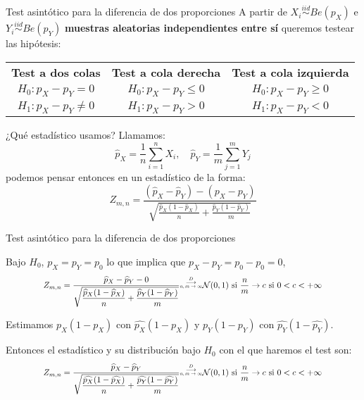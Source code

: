 \documentclass{beamer}
\theoremstyle{definition}
\newcommand\scalemath[2]{\scalebox{#1}{\mbox{\ensuremath{\displaystyle #2}}}}
\begin{document}
\begin{frame}{\color{rosee} Test asint\'otico para la diferencia de dos
   proporciones}\small
 A partir de $X_i\stackrel{iid}{\sim}Be(p_X)$ e $Y_i\stackrel{iid}{\sim}Be(p_Y)$ \textbf{muestras aleatorias independientes entre sí} queremos testear las hip\'otesis:

 \begin{center}
\begin{center}
\begin{tabular}{c|c|c}
\textbf{Test a dos colas} & \textbf{Test a cola derecha} & \textbf{Test a cola izquierda}\\
$H_0: p_X-p_Y = 0$  & $H_0: p_X-p_Y\leq 0$  &$H_0:p_X-p_Y\geq 0$\\
$H_1: p_X-p_Y \neq 0$  & $H_1: p_X-p_Y>0$  &$H_1:p_X-p_Y <0$
\end{tabular}
 \end{center}
     \end{center}
 ¿Qu\'e estad\'istico usamos?  Llamamos:
     \[\widehat{p}_X = \frac{1}{n}\sum_{i=1}^{n}X_i, \quad
       \widehat{p}_Y = \frac{1}{m}\sum_{j=1}^{m}Y_j \]  podemos
     pensar entonces en un estad\'istico de la forma:
     \[Z_{m,n} =  \frac{(\widehat{p}_X -
         \widehat{p}_Y)-(p_X-p_Y)}{\sqrt{\frac{\widehat{p}_X(1-\widehat{p}_X)}{n} +
           \frac{\widehat{p}_Y(1-\widehat{p}_Y)}{m}}}\]

 
\end{frame}

\begin{frame}{\color{rosee} Test asint\'otico para la diferencia de dos proporciones}
 \small
 
 Bajo $H_0$, $p_X=p_Y=p_0$ lo que implica que
     $p_X-p_Y=p_0-p_0=0$,
     \[\scalemath{0.85}{Z_{m,n} =  \dfrac{\widehat{p}_X -
         \widehat{p}_Y-0}{\sqrt{\dfrac{\widehat{p}_X(1-\widehat{p}_X)}{n} + \dfrac{\widehat{p}_Y(1-\widehat{p}_Y)}{m}}}
       \overset{\stackrel{D}{\longrightarrow}}{\scalemath{0.6}{n,m\to\infty}} \mathcal{N}(0,1) \text{ si } \frac{n}{m}\to c \text{ si } 0<c<+\infty}\]

 Estimamos $p_X(1-p_X)$ con $\widehat{p_X}(1-\widehat{p_X})$ y $p_Y(1-p_Y)$ con $\widehat{p_Y}(1-\widehat{p_Y})$.
 
 \medskip
 
         Entonces el estadístico y su distribución bajo $H_0$ con el que haremos el test son:
\[\scalemath{0.85}{Z_{m,n} =  \dfrac{\widehat{p}_X -
         \widehat{p}_Y}{\sqrt{\dfrac{\widehat{p_X}(1-\widehat{p_X})}{n} + \dfrac{\widehat{p_Y}(1-\widehat{p_Y})}{m}}} \overset{\stackrel{D}{\longrightarrow}}{\scalemath{0.6}{n,m\to\infty}} \mathcal{N}(0,1) \text{ si } \frac{n}{m}\to c \text{ si } 0<c<+\infty}\]
\end{frame}
\end{document}
